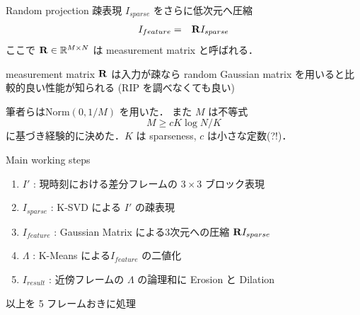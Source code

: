 \begin{frame}{Random projection}
疎表現 $I_{sparse}$ をさらに低次元へ圧縮
\begin{eqnarray}
    I_{feature} & = & {\mathbf{R}} I_{sparse}
\end{eqnarray}
ここで ${\mathbf{R}} \in {\mathbb{R}^{M \times N}}$ は measurement matrix と呼ばれる．
\begin{block}{measurement matrix}
${\mathbf{R}}$ は入力が疎なら random Gaussian matrix を用いると比較的良い性能が知られる (RIP を調べなくても良い)\cite{Candes2006}
\end{block}
筆者らは$\mathrm{Norm}(0, 1/M)$ を用いた．
また $M$ は不等式
\begin{equation}
    M \geq c K \log{N/K}
\end{equation}
に基づき経験的に決めた．$K$ は sparseness, $c$ は小さな定数(?!)．
\end{frame}


\begin{frame}{Main working steps}
\begin{enumerate}
    \item $I'$ : 現時刻における差分フレームの $3\times3$ ブロック表現
    \item $I_{sparse}$ : K-SVD による $I'$ の疎表現
    \item $I_{feature}$ : Gaussian Matrix による3次元への圧縮 ${\mathbf{R}} I_{sparse}$
    \item $\Lambda$ : K-Means による$I_{feature}$ の二値化
    \item $I_{result}$ : 近傍フレームの $\Lambda$ の論理和に Erosion と Dilation
\end{enumerate}
以上を 5 フレームおきに処理
\end{frame}
